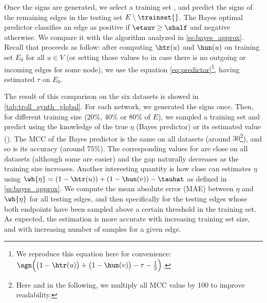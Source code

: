 Once the signs are generated, we select a training set \trainset{} \uar{}, and predict
the signs of the remaining edges in the testing set $E\setminus \trainset{}$. The Bayes optimal
predictor classifies an edge \euv{} as positive if $\etauv \geq \shalf$ and negative otherwise. 
We compare it with the \usrule{} algorithm analyzed in \autoref{ss:bayes_approx}. Recall that
\usrule{} proceeds as follow: after computing $\htr(u)$ and $\hun(u)$ on training set $E_0$ for all
$u \in V$ (or setting those values to \shalf{} in case there is no outgoing or incoming edges for
some node), we use the equation \eqref{eq:predictor}\footnote{We reproduce this equation here for
convenience: $\sgn\Big(\big(1-\htr(u)\big) + \big(1-\hun(v)\big) -\tau - \tfrac{1}{2}\Big)$.},
having estimated $\tau$ on $E_0$.

The result of this comparison on the six datasets is showed in \autoref{tab:troll_synth_global}.
For each network, we generated the signs once. Then, for different training size (20\%, 40\% or 80\%
of $E$), we sampled a training set and predict using the knowledge of the true $\eta$ (Bayes
predictor) or its estimated value (\usrule{}).
The MCC of the Bayes predictor is the same on all datasets (around $30$\footnote{Here and in the
following, we multiply all MCC value by 100 to improve readability.}), and so is its accuracy
(around $75\%$). The corresponding values for \usrule{} are close on all datasets (although some are
easier) and the gap naturally decreases as the training size increases. Another interesting
quantity is how close can \usrule{} estimates $\eta$ using $\wh{\eta} = \left(1-\htr(u)\right) +
\left(1-\hun(v)\right) -\tauhat$ as defined in \autoref{ss:bayes_approx}. We compute the mean
absolute error (MAE) between $\eta$ and $\wh{\eta}$ for all testing edges, and then specifically for
the testing edges whose both endpoints have been sampled above a certain threshold in the training
set. As expected, the estimation is more accurate with increasing training set size, and with
increasing number of samples for a given edge.



